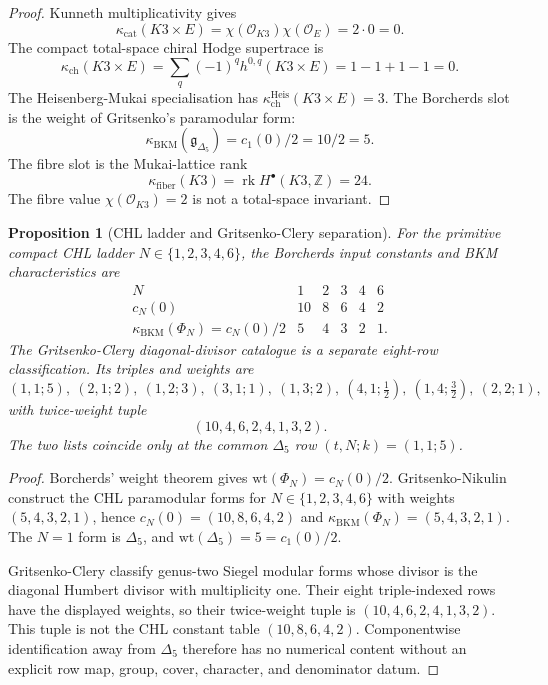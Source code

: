 \documentclass[11pt]{article}
\newtheorem{proposition}[theorem]{Proposition}
\theoremstyle{definition}
\providecommand{\Z}{\mathbb{Z}}
\providecommand{\cO}{\mathcal{O}}
\providecommand{\kch}{\kappa_{\mathrm{ch}}}
\providecommand{\kcat}{\kappa_{\mathrm{cat}}}
\providecommand{\kBKM}{\kappa_{\mathrm{BKM}}}
\providecommand{\kfib}{\kappa_{\mathrm{fiber}}}
\providecommand{\fg}{\mathfrak{g}}
\begin{document}
\begin{proof}
Kunneth multiplicativity gives
\[
 \kcat(K3\times E)
 =
 \chi(\cO_{K3})\chi(\cO_E)
 =
 2\cdot0
 =
 0.
\]
The compact total-space chiral Hodge supertrace is
\[
 \kch(K3\times E)
 =
 \sum_q(-1)^q h^{0,q}(K3\times E)
 =
 1-1+1-1
 =
 0.
\]
The Heisenberg-Mukai specialisation has
$\kch^{\mathrm{Heis}}(K3\times E)=3$.  The Borcherds slot is the weight
of Gritsenko's paramodular form:
\[
 \kBKM(\fg_{\Delta_5})=c_1(0)/2=10/2=5.
\]
The fibre slot is the Mukai-lattice rank
\[
 \kfib(K3)=\operatorname{rk}H^\bullet(K3,\Z)=24.
\]
The fibre value $\chi(\cO_{K3})=2$ is not a total-space invariant.
\end{proof}

\begin{proposition}[CHL ladder and Gritsenko-Clery separation]
\label{prop:chl-gc-separation}
For the primitive compact CHL ladder
$N\in\{1,2,3,4,6\}$, the Borcherds input constants and BKM
characteristics are
\[
\begin{array}{c|ccccc}
N&1&2&3&4&6\\ \hline
c_N(0)&10&8&6&4&2\\
\kBKM(\Phi_N)=c_N(0)/2&5&4&3&2&1 .
\end{array}
\]
The Gritsenko-Clery diagonal-divisor catalogue is a separate eight-row
classification.  Its triples and weights are
\[
 (1,1;5),\ (2,1;2),\ (1,2;3),\ (3,1;1),\
 (1,3;2),\ (4,1;\tfrac12),\ (1,4;\tfrac32),\ (2,2;1),
\]
with twice-weight tuple
\[
 (10,4,6,2,4,1,3,2).
\]
The two lists coincide only at the common $\Delta_5$ row
$(t,N;k)=(1,1;5)$.
\end{proposition}

\begin{proof}
Borcherds' weight theorem gives
$\mathrm{wt}(\Phi_N)=c_N(0)/2$.  Gritsenko-Nikulin construct the CHL
paramodular forms for $N\in\{1,2,3,4,6\}$ with weights
$(5,4,3,2,1)$, hence
$c_N(0)=(10,8,6,4,2)$ and
$\kBKM(\Phi_N)=(5,4,3,2,1)$.  The $N=1$ form is $\Delta_5$, and
$\mathrm{wt}(\Delta_5)=5=c_1(0)/2$.

Gritsenko-Clery classify genus-two Siegel modular forms whose divisor is
the diagonal Humbert divisor with multiplicity one.  Their eight
triple-indexed rows have the displayed weights, so their twice-weight
tuple is $(10,4,6,2,4,1,3,2)$.  This tuple is not the CHL constant table
$(10,8,6,4,2)$.  Componentwise identification away from $\Delta_5$
therefore has no numerical content without an explicit row map, group,
cover, character, and denominator datum.
\end{proof}
\end{document}

